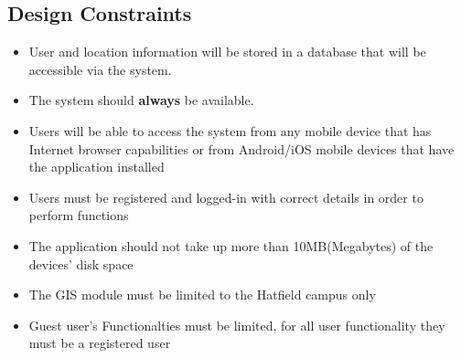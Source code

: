 
\subsection{Design Constraints}
\begin{itemize}
    \item User and location information will be stored in a database that will be accessible via the system.
    \item The system should \textbf{always} be available.
    \item Users will be able to access the system from any mobile device that has Internet browser capabilities or from Android/iOS mobile devices that have the application installed
    \item Users must be registered and logged-in with correct details in order to perform functions
    \item The application should not take up more than 10MB(Megabytes) of the devices' disk space
    \item The GIS module must be limited to the Hatfield campus only
    \item Guest user's Functionalties must be limited, for all user functionality they must be a registered user
    
\end{itemize}
